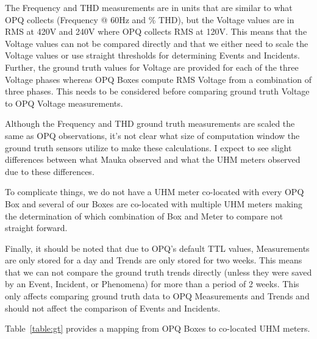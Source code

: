 The Frequency and THD measurements are in units that are similar to what OPQ collects (Frequency @ 60Hz and \% THD), but the Voltage values are in RMS at 420V and 240V where OPQ collects RMS at 120V. This means that the Voltage values can not be compared directly and that we either need to scale the Voltage values or use straight thresholds for determining Events and Incidents. Further, the ground truth values for Voltage are provided for each of the three Voltage phases whereas OPQ Boxes compute RMS Voltage from a combination of three phases. This needs to be considered before comparing ground truth Voltage to OPQ Voltage measurements.

Although the Frequency and THD ground truth measurements are scaled the same as OPQ observations, it's not clear what size of computation window the ground truth sensors utilize to make these calculations. I expect to see slight differences between what Mauka observed and what the UHM meters observed due to these differences.

To complicate things, we do not have a UHM meter co-located with every OPQ Box and several of our Boxes are co-located with multiple UHM meters making the determination of which combination of Box and Meter to compare not straight forward.

Finally, it should be noted that due to OPQ's default TTL values, Measurements are only stored for a day and Trends are only stored for two weeks. This means that we can not compare the ground truth trends directly (unless they were saved by an Event, Incident, or Phenomena) for more than a period of 2 weeks. This only affects comparing ground truth data to OPQ Measurements and Trends and should not affect the comparison of Events and Incidents.

Table~\ref{table:gt} provides a mapping from OPQ Boxes to co-located UHM meters.

